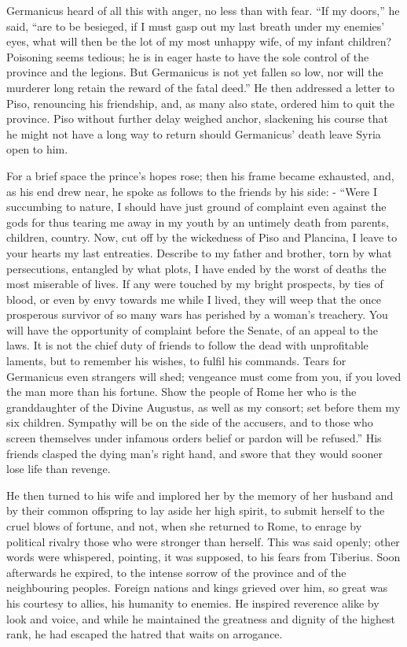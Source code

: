 
Germanicus heard of all this with anger, no less than with fear. ``If my doors,'' he said, ``are to be besieged, if I must gasp out my last breath under my enemies' eyes, what will then be the lot of my most unhappy wife, of my infant children? Poisoning seems tedious; he is in eager haste to have the sole control of the province and the legions. But Germanicus is not yet fallen so low, nor will the murderer long retain the reward of the fatal deed.'' He then addressed a letter to Piso, renouncing his friendship, and, as many also state, ordered him to quit the province. Piso without further delay weighed anchor, slackening his course that he might not have a long way to return should Germanicus' death leave Syria open to him.


For a brief space the prince's hopes rose; then his frame became exhausted, and, as his end drew near, he spoke as follows to the friends by his side: - ``Were I succumbing to nature, I should have just ground of complaint even against the gods for thus tearing me away in my youth by an untimely death from parents, children, country. Now, cut off by the wickedness of Piso and Plancina, I leave to your hearts my last entreaties. Describe to my father and brother, torn by what persecutions, entangled by what plots, I have ended by the worst of deaths the most miserable of lives. If any were touched by my bright prospects, by ties of blood, or even by envy towards me while I lived, they will weep that the once prosperous survivor of so many wars has perished by a woman's treachery. You will have the opportunity of complaint before the Senate, of an appeal to the laws. It is not the chief duty of friends to follow the dead with unprofitable laments, but to remember his wishes, to fulfil his commands. Tears for Germanicus even strangers will shed; vengeance must come from you, if you loved the man more than his fortune. Show the people of Rome her who is the granddaughter of the Divine Augustus, as well as my consort; set before them my six children. Sympathy will be on the side of the accusers, and to those who screen themselves under infamous orders belief or pardon will be refused.'' His friends clasped the dying man's right hand, and swore that they would sooner lose life than revenge.


He then turned to his wife and implored her by the memory of her husband and by their common offspring to lay aside her high spirit, to submit herself to the cruel blows of fortune, and not, when she returned to Rome, to enrage by political rivalry those who were stronger than herself. This was said openly; other words were whispered, pointing, it was supposed, to his fears from Tiberius. Soon afterwards he expired, to the intense sorrow of the province and of the neighbouring peoples. Foreign nations and kings grieved over him, so great was his courtesy to allies, his humanity to enemies. He inspired reverence alike by look and voice, and while he maintained the greatness and dignity of the highest rank, he had escaped the hatred that waits on arrogance.

